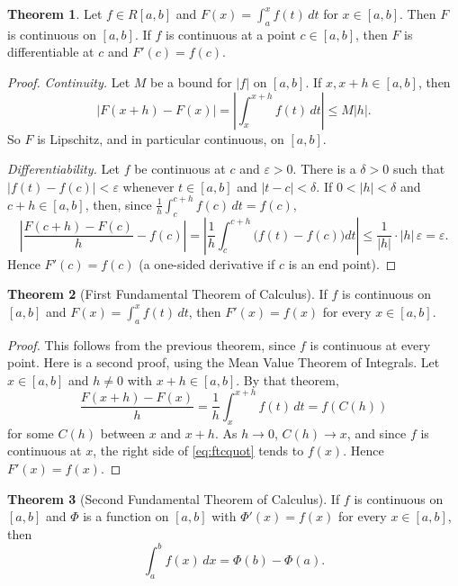 \documentclass[11pt,a4paper]{article}
\numberwithin{equation}{section}
\theoremstyle{definition}
\newtheorem{thm}{Theorem}[subsection]
\begin{document}
\begin{thm}
Let $f\in R[a,b]$ and $F(x) = \int^x_af(t)\, dt$ for $x\in [a,b]$. Then $F$ is continuous on $[a,b]$. If $f$ is continuous at a point $c\in [a,b]$, then $F$ is differentiable at $c$ and $F'(c) = f(c)$.
\end{thm}

\begin{proof}
\emph{Continuity.} Let $M$ be a bound for $|f|$ on $[a,b]$. If $x, x + h\in [a,b]$, then
$$|F(x  + h) - F(x)| = \left|\int^{x + h}_xf(t)\, dt\right| \leq M |h| .$$
So $F$ is Lipschitz, and in particular continuous, on $[a,b]$.

\emph{Differentiability.} Let $f$ be continuous at $c$ and $\varepsilon > 0$. There is a $\delta > 0$ such that $|f(t) - f(c)| < \varepsilon$ whenever $t\in[a,b]$ and $|t - c| < \delta$. If $0<|h|<\delta$ and $c+h\in[a,b]$, then, since $\frac{1}{h}\int_c^{c+h} f(c)\,dt = f(c)$,
$$\left|\frac{F(c + h) - F(c)}{h} - f(c)\right| = \left|\frac{1}{h} \int^{c+h}_c\bigl(f(t) - f(c)\bigr) dt\right| \leq \frac{1}{|h|}\cdot|h|\,\varepsilon = \varepsilon .$$
Hence $F'(c) = f(c)$ (a one-sided derivative if $c$ is an end point).
\end{proof}


\begin{thm}[First Fundamental Theorem of Calculus]
If $f$ is continuous on $[a,b]$ and $F(x) = \int^x_af(t)\, dt$, then $F'(x) = f(x)$ for every $x\in [a,b]$.
\end{thm}

\begin{proof}
This follows from the previous theorem, since $f$ is continuous at every point. Here is a second proof, using the Mean Value Theorem of Integrals. Let $x\in[a,b]$ and $h\neq0$ with $x+h\in[a,b]$. By that theorem,
\begin{equation}\label{eq:ftcquot}
\frac{F(x + h) - F(x)}{h} = \frac{1}{h}\int_x^{x+h}f(t)\,dt = f(C(h))
\end{equation}
for some $C(h)$ between $x$ and $x+h$. As $h\longrightarrow0$, $C(h)\longrightarrow x$, and since $f$ is continuous at $x$, the right side of \eqref{eq:ftcquot} tends to $f(x)$. Hence $F'(x) = f(x)$.
\end{proof}


\begin{thm}[Second Fundamental Theorem of Calculus]
If $f$ is continuous on $[a,b]$ and $\Phi$ is a function on $[a,b]$ with $\Phi' (x) = f(x)$ for every $x\in [a,b]$, then
$$\int^b_af(x)\, dx = \Phi (b) - \Phi (a) .$$
\end{thm}
\end{document}
